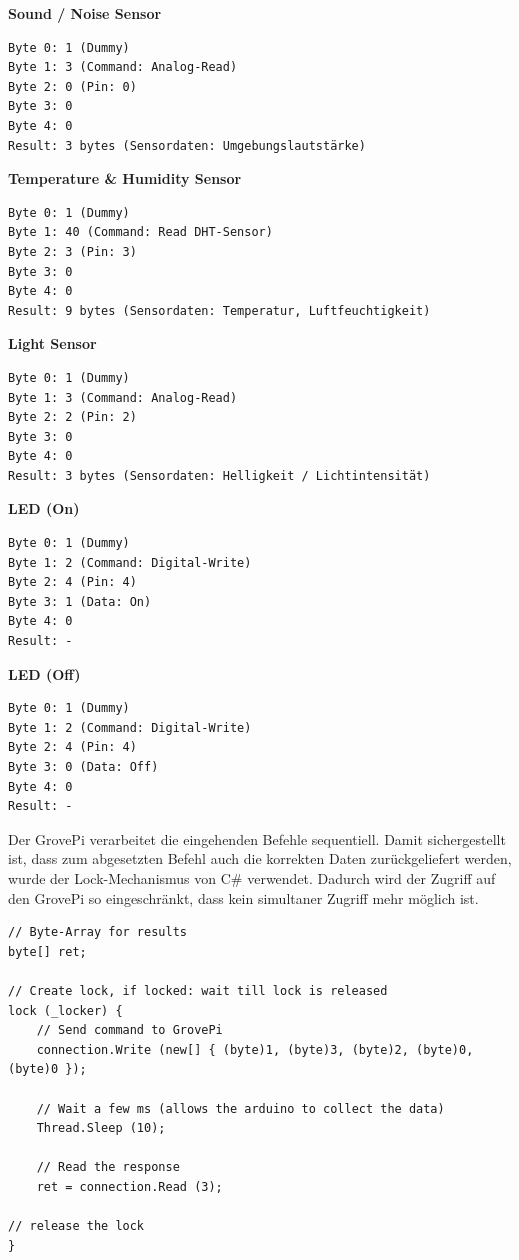 \textbf{Sound / Noise Sensor}
\begin{lstlisting}
Byte 0: 1 (Dummy)
Byte 1: 3 (Command: Analog-Read)
Byte 2: 0 (Pin: 0)
Byte 3: 0
Byte 4: 0
Result: 3 bytes (Sensordaten: Umgebungslautstärke)
\end{lstlisting}

\textbf{Temperature \& Humidity Sensor}
\begin{lstlisting}
Byte 0: 1 (Dummy)
Byte 1: 40 (Command: Read DHT-Sensor)
Byte 2: 3 (Pin: 3)
Byte 3: 0
Byte 4: 0
Result: 9 bytes (Sensordaten: Temperatur, Luftfeuchtigkeit)
\end{lstlisting}

\textbf{Light Sensor}
\begin{lstlisting}
Byte 0: 1 (Dummy)
Byte 1: 3 (Command: Analog-Read)
Byte 2: 2 (Pin: 2)
Byte 3: 0
Byte 4: 0
Result: 3 bytes (Sensordaten: Helligkeit / Lichtintensität)
\end{lstlisting}


\textbf{LED (On)}
\begin{lstlisting}
Byte 0: 1 (Dummy)
Byte 1: 2 (Command: Digital-Write)
Byte 2: 4 (Pin: 4)
Byte 3: 1 (Data: On)
Byte 4: 0
Result: -
\end{lstlisting}

\textbf{LED (Off)}
\begin{lstlisting}
Byte 0: 1 (Dummy)
Byte 1: 2 (Command: Digital-Write)
Byte 2: 4 (Pin: 4)
Byte 3: 0 (Data: Off)
Byte 4: 0
Result: -
\end{lstlisting}


Der GrovePi verarbeitet die eingehenden Befehle sequentiell. Damit sichergestellt ist, dass zum abgesetzten Befehl auch die korrekten Daten zurückgeliefert werden, wurde der Lock-Mechanismus von C\# verwendet. Dadurch wird der Zugriff auf den GrovePi so eingeschränkt, dass kein simultaner Zugriff mehr möglich ist.

\begin{lstlisting}
// Byte-Array for results
byte[] ret; 

// Create lock, if locked: wait till lock is released
lock (_locker) { 
	// Send command to GrovePi
	connection.Write (new[] { (byte)1, (byte)3, (byte)2, (byte)0, (byte)0 }); 
	
	// Wait a few ms (allows the arduino to collect the data)
	Thread.Sleep (10); 
	
	// Read the response
	ret = connection.Read (3); 
	
// release the lock
} 
\end{lstlisting}


